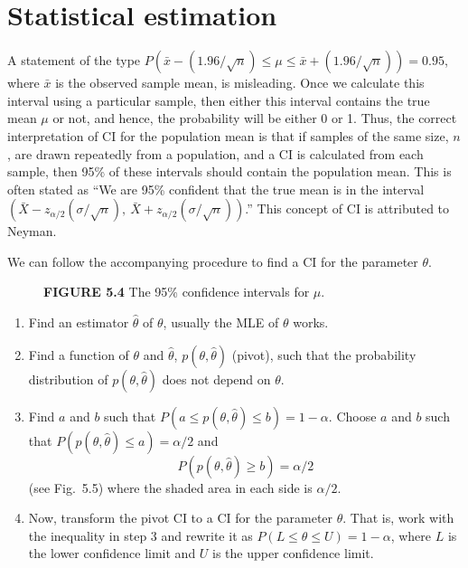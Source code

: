 \section*{Statistical estimation}

A statement of the type $P(\bar{x} - (1.96/\sqrt{n}) \leq \mu \leq \bar{x} + (1.96/\sqrt{n})) = 0.95$, where $\bar{x}$ is the observed sample mean, is misleading. Once we calculate this interval using a particular sample, then either this interval contains the true mean $\mu$ or not, and hence, the probability will be either 0 or 1. Thus, the correct interpretation of CI for the population mean is that if samples of the same size, $n$, are drawn repeatedly from a population, and a CI is calculated from each sample, then 95\% of these intervals should contain the population mean. This is often stated as ``We are 95\% confident that the true mean is in the interval $(\bar{X} - z_{\alpha/2}(\sigma/\sqrt{n}),\ \bar{X} + z_{\alpha/2}(\sigma/\sqrt{n}))$.'' This concept of CI is attributed to Neyman.

We can follow the accompanying procedure to find a CI for the parameter $\theta$.

\begin{figure}[h]
\centering
{}
\caption*{\textbf{FIGURE 5.4} The 95\% confidence intervals for $\mu$.}
\end{figure}

\begin{tcolorbox}[title=\textbf{Procedure to find a confidence interval for $\theta$ using the pivot}]
\begin{enumerate}
    \item Find an estimator $\hat{\theta}$ of $\theta$, usually the MLE of $\theta$ works.
    \item Find a function of $\theta$ and $\hat{\theta}$, $p(\theta, \hat{\theta})$ (pivot), such that the probability distribution of $p(\theta, \hat{\theta})$ does not depend on $\theta$.
    \item Find $a$ and $b$ such that $P\!\left(a \leq p(\theta, \hat{\theta}) \leq b\right) = 1 - \alpha$. Choose $a$ and $b$ such that $P\!\left(p(\theta, \hat{\theta}) \leq a\right) = \alpha/2$ and
    \begin{equation*}
        P\!\left(p(\theta, \hat{\theta}) \geq b\right) = \alpha/2
    \end{equation*}
    (see Fig.~5.5) where the shaded area in each side is $\alpha/2$.
    \item Now, transform the pivot CI to a CI for the parameter $\theta$. That is, work with the inequality in step 3 and rewrite it as $P(L \leq \theta \leq U) = 1 - \alpha$, where $L$ is the lower confidence limit and $U$ is the upper confidence limit.
\end{enumerate}
\end{tcolorbox}

